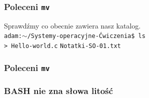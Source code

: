 \documentclass[10pt,t]{beamer}
\begin{document}
\begin{frame}
  \frametitle{Poleceni \texttt{mv}}


  Sprawdźmy co obecnie zawiera nasz katalog. \\
  \texttt{adam:$\sim$/Systemy-operacyjne-Ćwiczenia\$ ls} \\
  \texttt{> Hello-world.c} \quad
  \texttt{Notatki-SO-01.txt} \quad
  \texttt{} \\

\end{frame}





\begin{frame}
  \frametitle{Poleceni \texttt{mv}}




\end{frame}





\begin{frame}
  \frametitle{BASH nie zna słowa litość}




\end{frame}














\end{document}
